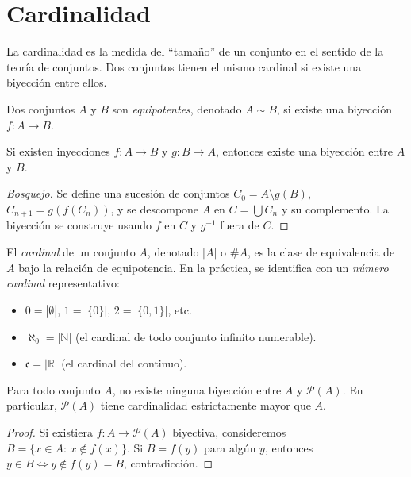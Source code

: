 \section{Cardinalidad}

La cardinalidad es la medida del ``tamaño'' de un conjunto en el sentido de la teoría de conjuntos. Dos conjuntos tienen el mismo cardinal si existe una biyección entre ellos.

\begin{definition}
\label{def:equipotencia}
Dos conjuntos $A$ y $B$ son \emph{equipotentes}, denotado $A\sim B$, si existe una biyección $f\colon A\to B$.
\end{definition}

\begin{theorem}
\label{teo:cbs}
Si existen inyecciones $f\colon A\to B$ y $g\colon B\to A$, entonces existe una biyección entre $A$ y $B$.
\end{theorem}

\begin{proof}[Bosquejo]
Se define una sucesión de conjuntos $C_0=A\setminus g(B)$, $C_{n+1}=g(f(C_n))$, y se descompone $A$ en $C=\bigcup C_n$ y su complemento. La biyección se construye usando $f$ en $C$ y $g^{-1}$ fuera de $C$.
\end{proof}

\begin{definition}
El \emph{cardinal} de un conjunto $A$, denotado $|A|$ o $\#A$, es la clase de equivalencia de $A$ bajo la relación de equipotencia. En la práctica, se identifica con un \emph{número cardinal} representativo:
\begin{itemize}
  \item $0=|\emptyset|$, $1=|\{0\}|$, $2=|\{0,1\}|$, etc.
  \item $\aleph_0=|\mathbb{N}|$ (el cardinal de todo conjunto infinito numerable).
  \item $\mathfrak{c}=|\mathbb{R}|$ (el cardinal del continuo).
\end{itemize}
\end{definition}

\begin{theorem}[Cantor]
\label{teo:cantor-potencia}
Para todo conjunto $A$, no existe ninguna biyección entre $A$ y $\mathcal{P}(A)$. En particular, $\mathcal{P}(A)$ tiene cardinalidad estrictamente mayor que $A$.
\end{theorem}

\begin{proof}
Si existiera $f\colon A\to\mathcal{P}(A)$ biyectiva, consideremos $B=\{x\in A:\,x\notin f(x)\}$. Si $B=f(y)$ para algún $y$, entonces $y\in B\Leftrightarrow y\notin f(y)=B$, contradicción.
\end{proof}

